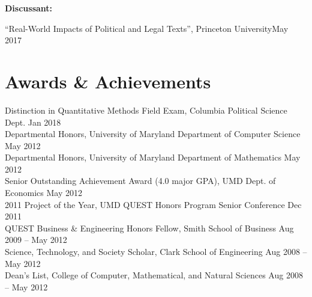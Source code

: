 \documentclass[letterpaper,11pt]{article}
\newcommand{\cvitemsep}{2mm}
\begin{document}

\textbf{Discussant:}\vspace{\cvitemsep}

``Real-World Impacts of Political and Legal Texts'', Princeton University\hfill May 2017 \\


\section{Awards \& Achievements}

Distinction in Quantitative Methods Field Exam, Columbia Political Science Dept. \hfill Jan 2018\vspace{1mm} \\
Departmental Honors, University of Maryland Department of Computer Science \hfill May 2012\vspace{1mm} \\
Departmental Honors, University of Maryland Department of Mathematics \hfill May 2012\vspace{1mm} \\
Senior Outstanding Achievement Award (4.0 major GPA), UMD Dept. of Economics \hfill May 2012\vspace{1mm} \\
2011 Project of the Year, UMD QUEST Honors Program Senior Conference \hfill Dec 2011\vspace{1mm} \\
QUEST Business & Engineering Honors Fellow, Smith School of Business \hfill Aug 2009 -- May 2012\vspace{1mm} \\
Science, Technology, and Society Scholar, Clark School of Engineering \hfill Aug 2008 -- May 2012\vspace{1mm} \\
Dean's List, College of Computer, Mathematical, and Natural Sciences \hfill Aug 2008 -- May 2012\vspace{1mm} \\
\end{document}

